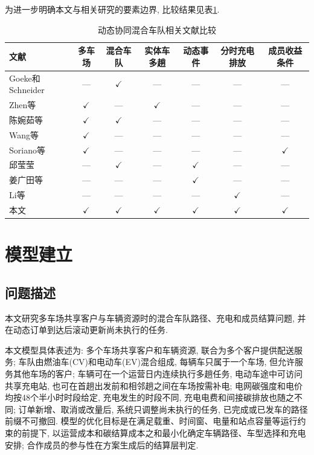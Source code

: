 \documentclass{setp-new}
\newcommand{\setptabsetup}{\fontsize{9pt}{10.5pt}\selectfont\renewcommand{\arraystretch}{0.95}\setlength{\tabcolsep}{2.2pt}\setlength{\aboverulesep}{0.4pt}\setlength{\belowrulesep}{0.4pt}\hbadness=10000}
\begin{document}
为进一步明确本文与相关研究的要素边界, 比较结果见表\ref{tab:literature-comparison}.

\begin{table}[H]
\centering
\caption{动态协同混合车队相关文献比较}
\label{tab:literature-comparison}
\setptabsetup
\begin{tabular*}{\linewidth}{@{\extracolsep{\fill}}lcccccc@{}}
\toprule
文献 & 多车场 & 混合车队 & 实体车多趟 & 动态事件 & 分时充电排放 & 成员收益条件\\
\midrule
Goeke和Schneider\cite{ref:27} & --- & $\checkmark$ & --- & --- & --- & ---\\
Zhen等\cite{ref:44} & $\checkmark$ & --- & $\checkmark$ & --- & --- & ---\\
陈婉茹等\cite{ref:23} & $\checkmark$ & $\checkmark$ & --- & --- & --- & ---\\
Wang等\cite{ref:7} & $\checkmark$ & --- & --- & --- & --- & ---\\
Soriano等\cite{ref:8} & $\checkmark$ & --- & --- & --- & --- & $\checkmark$\\
邱莹莹\cite{ref:71} & --- & $\checkmark$ & --- & $\checkmark$ & --- & ---\\
姜广田等\cite{ref:51} & --- & --- & --- & $\checkmark$ & --- & ---\\
Li等\cite{ref:52} & --- & --- & --- & --- & $\checkmark$ & ---\\
本文 & $\checkmark$ & $\checkmark$ & $\checkmark$ & $\checkmark$ & $\checkmark$ & $\checkmark$\\
\bottomrule
\end{tabular*}
\end{table}


\section{模型建立}

\subsection{问题描述}

本文研究多车场共享客户与车辆资源时的混合车队路径、充电和成员结算问题,
并在动态订单到达后滚动更新尚未执行的任务.

本文模型具体表述为:
多个车场共享客户和车辆资源, 联合为多个客户提供配送服务;
车队由燃油车(CV)和电动车(EV)混合组成, 每辆车只属于一个车场, 但允许服务其他车场的客户;
车辆可在一个运营日内连续执行多趟任务,
电动车途中可访问共享充电站, 也可在首趟出发前和相邻趟之间在车场按需补电;
电网碳强度和电价均按48个半小时时段给定,
充电发生的时段不同, 充电电费和间接碳排放也随之不同;
订单新增、取消或改量后, 系统只调整尚未执行的任务, 已完成或已发车的路径前缀不可撤回.
模型的优化目标是在满足载重、时间窗、电量和站点容量等运行约束的前提下,
以运营成本和碳结算成本之和最小化确定车辆路径、车型选择和充电安排;
合作成员的参与性在方案生成后的结算层判定.
\end{document}
